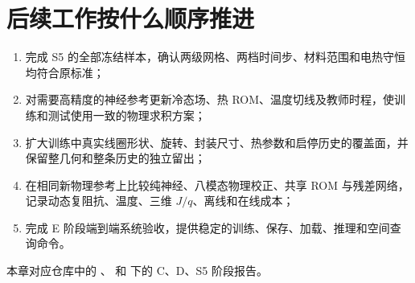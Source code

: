 \section{后续工作按什么顺序推进}
\begin{enumerate}
\item 完成 S5 的全部冻结样本，确认两级网格、两档时间步、材料范围和电热守恒均符合原标准；
\item 对需要高精度的神经参考更新冷态场、热 ROM、温度切线及教师时程，使训练和测试使用一致的物理求积方案；
\item 扩大训练中真实线圈形状、旋转、封装尺寸、热参数和启停历史的覆盖面，并保留整几何和整条历史的独立留出；
\item 在相同新物理参考上比较纯神经、八模态物理校正、共享 ROM 与残差网络，记录动态复阻抗、温度、三维 $J/q$、离线和在线成本；
\item 完成 E 阶段端到端系统验收，提供稳定的训练、保存、加载、推理和空间查询命令。
\end{enumerate}

本章对应仓库中的 、 和  下的 C、D、S5 阶段报告。
